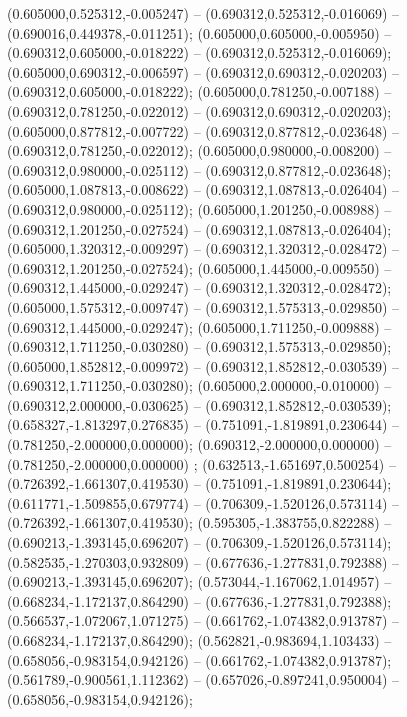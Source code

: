  (0.605000,0.525312,-0.005247) -- (0.690312,0.525312,-0.016069) -- (0.690016,0.449378,-0.011251);
 (0.605000,0.605000,-0.005950) -- (0.690312,0.605000,-0.018222) -- (0.690312,0.525312,-0.016069);
 (0.605000,0.690312,-0.006597) -- (0.690312,0.690312,-0.020203) -- (0.690312,0.605000,-0.018222);
 (0.605000,0.781250,-0.007188) -- (0.690312,0.781250,-0.022012) -- (0.690312,0.690312,-0.020203);
 (0.605000,0.877812,-0.007722) -- (0.690312,0.877812,-0.023648) -- (0.690312,0.781250,-0.022012);
 (0.605000,0.980000,-0.008200) -- (0.690312,0.980000,-0.025112) -- (0.690312,0.877812,-0.023648);
 (0.605000,1.087813,-0.008622) -- (0.690312,1.087813,-0.026404) -- (0.690312,0.980000,-0.025112);
 (0.605000,1.201250,-0.008988) -- (0.690312,1.201250,-0.027524) -- (0.690312,1.087813,-0.026404);
 (0.605000,1.320312,-0.009297) -- (0.690312,1.320312,-0.028472) -- (0.690312,1.201250,-0.027524);
 (0.605000,1.445000,-0.009550) -- (0.690312,1.445000,-0.029247) -- (0.690312,1.320312,-0.028472);
 (0.605000,1.575312,-0.009747) -- (0.690312,1.575313,-0.029850) -- (0.690312,1.445000,-0.029247);
 (0.605000,1.711250,-0.009888) -- (0.690312,1.711250,-0.030280) -- (0.690312,1.575313,-0.029850);
 (0.605000,1.852812,-0.009972) -- (0.690312,1.852812,-0.030539) -- (0.690312,1.711250,-0.030280);
 (0.605000,2.000000,-0.010000) -- (0.690312,2.000000,-0.030625) -- (0.690312,1.852812,-0.030539);
 (0.658327,-1.813297,0.276835) -- (0.751091,-1.819891,0.230644) -- (0.781250,-2.000000,0.000000);
 (0.690312,-2.000000,0.000000) -- (0.781250,-2.000000,0.000000) ;
 (0.632513,-1.651697,0.500254) -- (0.726392,-1.661307,0.419530) -- (0.751091,-1.819891,0.230644);
 (0.611771,-1.509855,0.679774) -- (0.706309,-1.520126,0.573114) -- (0.726392,-1.661307,0.419530);
 (0.595305,-1.383755,0.822288) -- (0.690213,-1.393145,0.696207) -- (0.706309,-1.520126,0.573114);
 (0.582535,-1.270303,0.932809) -- (0.677636,-1.277831,0.792388) -- (0.690213,-1.393145,0.696207);
 (0.573044,-1.167062,1.014957) -- (0.668234,-1.172137,0.864290) -- (0.677636,-1.277831,0.792388);
 (0.566537,-1.072067,1.071275) -- (0.661762,-1.074382,0.913787) -- (0.668234,-1.172137,0.864290);
 (0.562821,-0.983694,1.103433) -- (0.658056,-0.983154,0.942126) -- (0.661762,-1.074382,0.913787);
 (0.561789,-0.900561,1.112362) -- (0.657026,-0.897241,0.950004) -- (0.658056,-0.983154,0.942126);
